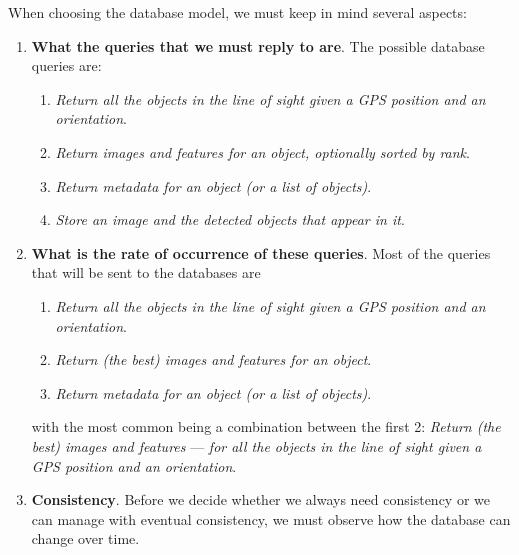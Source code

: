 \documentclass[a4paper,onecolumn,oneside,titlepage,11pt]{report}
\begin{document}
	When choosing the database model, we must keep in mind several aspects:
	\begin{enumerate}
		\item \textbf{What the queries that we must reply to are}. The possible database queries are:
		\begin{enumerate}
			\item \emph{Return all the objects in the line of sight given a GPS position and an orientation}.
			\item \emph{Return images and features for an object, optionally sorted by rank}.
			\item \emph{Return metadata for an object (or a list of objects)}.
			\item \emph{Store an image and the detected objects that appear in it}.
		\end{enumerate}
		\item \textbf{What is the rate of occurrence of these queries}. Most of the queries that will be sent to the databases are
		\begin{enumerate}
			\item \emph{Return all the objects in the line of sight given a GPS position and an orientation}.
			\item \emph{Return (the best) images and features for an object}.
			\item \emph{Return metadata for an object (or a list of objects)}.
		\end{enumerate}
		with the most common being a combination between the first 2: \emph{Return (the best) images and features} --- \emph{for all the objects in the line of sight given a GPS position and an orientation}.
		\item \textbf{Consistency}. Before we decide whether we always need consistency or we can manage with eventual consistency, we must observe how the database can change over time.
		

\end{enumerate}
\end{document}
